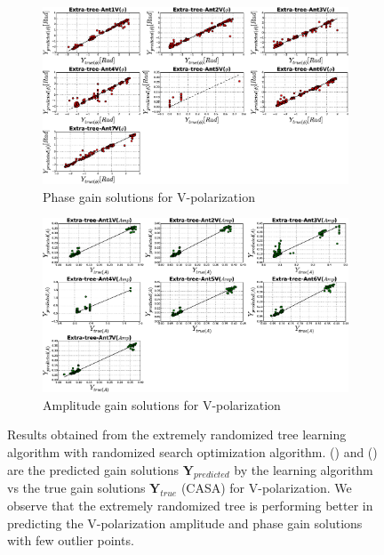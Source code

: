 \begin{figure}[H]
   \centering
    \begin{subfigure}[t]{0.52\textheight}
        
        \includegraphics[width=\textwidth]{images/Extra-treeVphase.eps} 
        \caption{Phase gain solutions for V-polarization} \label{A7}
    \end{subfigure}
    
      \begin{subfigure}[t]{0.52\textheight}
       
        \includegraphics[width=\textwidth]{images/Extra-treeVamp.eps} 
        \caption{Amplitude gain solutions for V-polarization} \label{B7}
    \end{subfigure}
    \caption{Results obtained from the extremely randomized tree learning algorithm with randomized search optimization algorithm. () and () are the predicted gain solutions $\textbf{Y}_{predicted}$ by the learning algorithm vs the true gain solutions $\textbf{Y}_{true}$ (CASA) for V-polarization. We observe that the extremely randomized tree is performing better in predicting the V-polarization amplitude and phase gain solutions with few outlier points. }
    \label{BBB7}
    \end{figure} 
   
